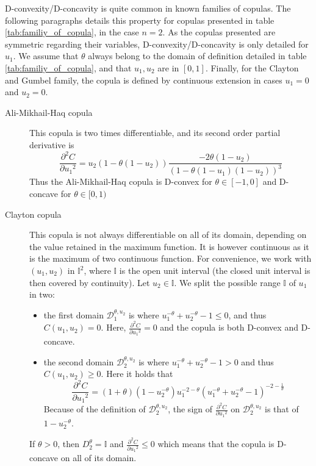 \begin{remark}
    D-convexity/D-concavity is quite common in known families of copulas. The following paragraphs details this property for copulas presented in table \ref{tab:familiy_of_copula}, in the case $n=2$.
    As the copulas presented are symmetric regarding their variables, D-convexity/D-concavity is only detailed for $u_1$. We assume that \( \theta \) always belong to the domain of definition detailed in table \ref{tab:familiy_of_copula}, and that \(u_1, u_2\) are in \([0, 1]\). Finally, for the Clayton and Gumbel family, the copula is defined by continuous extension in cases $u_1=0$ and $u_2=0$. 
    \begin{description}
        \item[Ali-Mikhail-Haq copula] This copula is two times differentiable, and its second order partial derivative is
        $$\frac{\partial^2 C}{\partial {u_1}^2}=u_2(1-\theta(1-u_2))\frac{-2\theta(1-u_2)}{(1-\theta(1-u_1)(1-u_2))^3}$$
        Thus the Ali-Mikhail-Haq copula is D-convex for $\theta\in[-1,0]$ and D-concave for $\theta\in[0,1)$
        \item[Clayton copula] This copula is not always differentiable on all of its domain, depending on the value retained in the maximum function. It is however continuous as it is the maximum of two continuous function. For convenience, we work with $(u_1, u_2)$ in $\mathbb{I}^2$, where $\mathbb{I}$ is the open unit interval (the closed unit interval is then covered by continuity). Let $u_2\in\mathbb{I}$. We split the possible range $\mathbb{I}$ of $u_1$ in two:
    \begin{itemize}
        \item the first domain $\mathcal{D}_1^{\theta,u_2}$ is where $u_1^{-\theta}+u_2^{-\theta}-1\leqslant0$, and thus $C(u_1, u_2)=0$. Here, $\frac{\partial^2 C}{\partial {u_1}^2}=0$ and the copula is both D-convex and D-concave.
        \item the second domain $\mathcal{D}_2^{\theta,u_2}$ is where $u_1^{-\theta}+u_2^{-\theta}-1>0$ and thus $C(u_1, u_2)\geqslant0$. Here it holds that
        $$\frac{\partial^2 C}{\partial {u_1}^2}=(1+\theta)(1-u_2^{-\theta})u_1^{-2-\theta}(u_1^{-\theta}+u_2^{-\theta}-1)^{-2-\frac{1}{\theta}}$$
        Because of the definition of $\mathcal{D}_2^{\theta,u_2}$, the sign of $\frac{\partial^2 C}{\partial {u_1}^2}$ on $\mathcal{D}_2^{\theta,u_2}$ is that of $1-u_2^{-\theta}$.
    \end{itemize}
    
    If $\theta>0$, then $D^\theta_2=\mathbb{I}$ and $\frac{\partial^2 C}{\partial {u_1}^2}\leqslant0$ which means that the copula is D-concave on all of its domain.
    

\end{description}
\end{remark}
